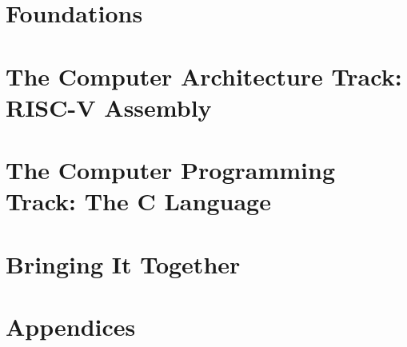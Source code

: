 \documentclass[11pt,twoside,openright]{book}
\begin{document}
\frontmatter


\tableofcontents



\mainmatter

\part{Foundations}



\part{The Computer Architecture Track: RISC-V Assembly}





\part{The Computer Programming Track: The C Language}




\part{Bringing It Together}


\appendix
\part{Appendices}







\backmatter

\end{document}
